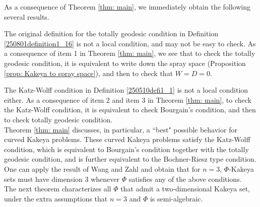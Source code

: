 \documentclass{article}
\numberwithin{equation}{section}
\theoremstyle{plain}
\begin{document}
As a consequence of 
Theorem \ref{thm: main}, we immediately obtain the following several results. 

The original definition for the totally geodesic condition in Definition \ref{250801definition1_16} is not a local condition, and may not be easy to check. As a consequence of item 1 in Theorem \ref{thm: main}, we see that to check the totally geodesic condition, it is equivalent to write down the spray space (Proposition \ref{prop: Kakeya to spray space}), and then to check that $W=D=0$. 


The Katz-Wolff condition in Definition \ref{250510defi1_1} is not a local condition either. As a consequence of item 2 and item 3 in Theorem \ref{thm: main}, to check the Katz-Wolff condition, it is equivalent to check Bourgain's condition, and then to check totally geodesic condition. \\





Theorem \ref{thm: main} discusses, in particular, a ``best" possible behavior for curved Kakeya problems. These curved Kakeya problems satisfy the Katz-Wolff condition, which is equivalent to Bourgain's condition together with the totally geodesic condition, and is further equivalent to the Bochner-Riesz type condition. One can apply the result of Wang and Zahl \cite{wang2025volume} and obtain that for $n=3$, $\Phi$-Kakeya sets must have dimension 3 whenever $\Phi$ satisfies any of the above conditions. \\





The next theorem characterizes all $\Phi$ that admit a two-dimensional Kakeya set, under the extra assumptions that $n=3$ and $\Phi$ is semi-algebraic. 
\end{document}
